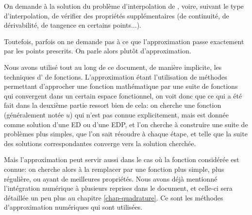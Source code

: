 \begin{histoire}
\medskip
{}
\end{histoire}


On demande à la solution du problème d'interpolation de , 
voire, suivant le type d'interpolation, de vérifier des propriétés supplémentaires (de continuité,
de dérivabilité, de tangence en certains points...).

Toutefois, parfois on ne demande pas à ce que l'approximation passe exactement
par les points prescrits. On parle alors plutôt d'approximation.

\medskip
Nous avons utilisé tout au long de ce document, de manière implicite, les techniques 
d' de fonctions.
L'approximation étant l'utilisation de méthodes permettant d'approcher une fonction mathématique 
par une suite de fonctions qui convergent dans un  certain espace fonctionnel, on voit donc que ce qui 
a été fait dans la deuxième partie ressort bien de cela:
on cherche une fonction (généralement notée $u$) qui n'est pas connue explicitement, mais est donnée 
comme solution d'une ED ou d'une EDP, et l'on cherche à construire une suite de problèmes plus simples, 
que l'on sait résoudre à chaque étape, et telle que la suite des solutions correspondantes converge 
vers la solution cherchée.

Mais l'approximation peut servir aussi dans le cas où la fonction considérée est connue:
on cherche alors à la remplacer par une fonction plus simple, plus régulière, ou ayant de meilleures 
propriétés. 
Nous avons déjà mentionné l'intégration numérique à plusieurs reprises dans le document, et 
celle-ci sera détaillée un peu plus au chapitre \ref{chap-quadrature}. Ce sont les méthodes d'approximation
numériques qui sont utilisées.

